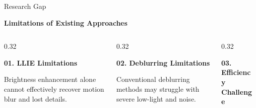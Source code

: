 ﻿\documentclass[
    11pt,%
    aspectratio=169,%
]{beamer}
\begin{document}
\begin{frame}{Research Gap}

\small


{\color{Navy}\bfseries
Limitations of Existing Approaches}

\vspace{0.15cm}

\begin{columns}[T,onlytextwidth]

    \begin{column}{0.32\textwidth}
        \begin{beamercolorbox}[
            rounded=true,
            sep=0.12cm,
            wd=\textwidth,
            ht=2.05cm
        ]{}
            {\color{orange!85!black}
            \bfseries 01. LLIE Limitations}

            \vspace{0.1cm}

            \fontsize{8.5}{10.5}\selectfont

            Brightness enhancement alone cannot effectively recover motion blur and lost details.
            \vspace{0.08cm}
        \end{beamercolorbox}
    \end{column}

    \begin{column}{0.32\textwidth}
        \begin{beamercolorbox}[
            rounded=true,
            sep=0.12cm,
            wd=\textwidth,
            ht=2.05cm
        ]{}
            {\color{orange!85!black}
            \bfseries 02. Deblurring Limitations}

            \vspace{0.1cm}

            Conventional deblurring methods may struggle with severe low-light and noise.

            \vspace{0.08cm}
        \end{beamercolorbox}
    \end{column}

    \begin{column}{0.32\textwidth}
        \begin{beamercolorbox}[
            rounded=true,
            sep=0.12cm,
            wd=\textwidth,
            ht=2.05cm
        ]{}
            {\color{orange!85!black}
            \bfseries 03. Efficiency Challenge}


\end{beamercolorbox}
\end{column}
\end{columns}
\end{frame}
\end{document}
